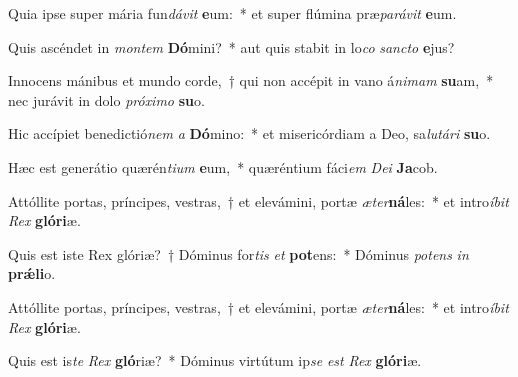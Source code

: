 \item Quia ipse super mária fun\textit{dá}\textit{vit} \textbf{e}um:~* et super flúmina præ\textit{pa}\textit{rá}\textit{vit} \textbf{e}um.
\item Quis ascéndet in \textit{mon}\textit{tem} \textbf{Dó}mini?~* aut quis stabit in lo\textit{co} \textit{sanc}\textit{to} \textbf{e}jus?
\item Innocens mánibus et mundo corde,~† qui non accépit in vano á\textit{ni}\textit{mam} \textbf{su}am,~* nec jurávit in dolo \textit{pró}\textit{xi}\textit{mo} \textbf{su}o.
\item Hic accípiet benedictió\textit{nem} \textit{a} \textbf{Dó}mino:~* et misericórdiam a Deo, sa\textit{lu}\textit{tá}\textit{ri} \textbf{su}o.
\item Hæc est generátio quærén\textit{ti}\textit{um} \textbf{e}um,~* quæréntium fáci\textit{em} \textit{De}\textit{i} \textbf{Ja}cob.
\item Attóllite portas, príncipes, vestras,~† et elevámini, portæ \textit{æ}\textit{ter}\textbf{ná}les:~* et intro\textit{í}\textit{bit} \textit{Rex} \textbf{gló}\textbf{ri}æ.
\item Quis est iste Rex glóriæ?~† Dóminus for\textit{tis} \textit{et} \textbf{pot}ens:~* Dóminus \textit{pot}\textit{ens} \textit{in} \textbf{prǽ}\textbf{li}o.
\item Attóllite portas, príncipes, vestras,~† et elevámini, portæ \textit{æ}\textit{ter}\textbf{ná}les:~* et intro\textit{í}\textit{bit} \textit{Rex} \textbf{gló}\textbf{ri}æ.
\item Quis est is\textit{te} \textit{Rex} \textbf{gló}riæ?~* Dóminus virtútum ip\textit{se} \textit{est} \textit{Rex} \textbf{gló}\textbf{ri}æ.
